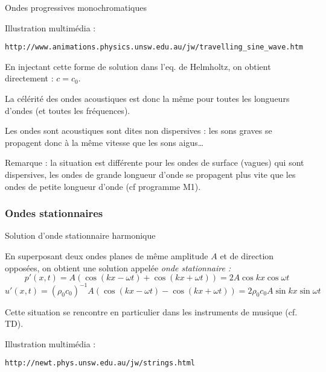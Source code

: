 \begin{frame}[fragile]{Ondes progressives monochromatiques}
\pause 

\smallskip

{\scriptsize 
Illustration multimédia :
\begin{verbatim}
http://www.animations.physics.unsw.edu.au/jw/travelling_sine_wave.htm
\end{verbatim}
}


\medskip

En injectant cette forme de solution dans l'eq. de Helmholtz, on obtient directement : $c = c_0$. 


La célérité des ondes acoustiques est donc la même pour toutes les longueurs d'ondes (et toutes les fréquences).


\medskip

Les ondes sont acoustiques sont dites \textcolor{vert}{non dispersives} : 
les sons graves se propagent donc à la même vitesse que les sons aigus\ldots

\medskip

\textcolor{gris}{
Remarque  : la situation est différente pour les ondes de surface (vagues) 
qui sont dispersives, les ondes de grande longueur d'onde se propagent plus vite que les ondes de petite longueur d'onde (cf programme M1).
}




\end{frame}

\subsubsection{Ondes stationnaires}
\begin{frame}[fragile]{Solution d'onde stationnaire harmonique}

En superposant deux ondes planes de même amplitude $A$ et de direction opposées, on obtient une solution appelée {\em onde stationnaire :}
$$
p'(x,t) = A \left( \cos (kx - \omega t) + \cos ( kx + \omega t) \right) = 2 A \cos k x \cos \omega t
$$
$$
u'(x,t) = (\rho_0 c_0)^{-1} A \left( \cos (kx - \omega t) - \cos ( kx + \omega t)  \right) = 2 \rho_0 c_0 A 
\sin k x \sin \omega t
$$

Cette situation se rencontre en particulier dans les instruments de musique (cf. TD).

\medskip

{\scriptsize Illustration multimédia :
\begin{verbatim}
http://newt.phys.unsw.edu.au/jw/strings.html
\end{verbatim}
}

\vspace{39mm}

\end{frame}


